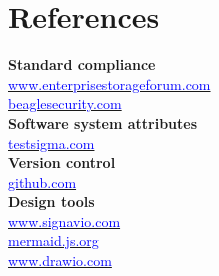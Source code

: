 \documentclass[11pt,twoside]{article}
\begin{document}
\section{References}
\textbf{Standard compliance}\\
\href{https://www.enterprisestorageforum.com/management/7-essential-compliance-regulations-for-data-storage-systems/}{\textcolor{blue}{www.enterprisestorageforum.com}}\\
\href{https://beaglesecurity.com/blog/article/software-compliance-standards.html}{\textcolor{blue}{beaglesecurity.com}}
\vspace{1\baselineskip} \\
\textbf{Software system attributes}\\
\href{https://testsigma.com/blog/software-quality-attributes/}{\textcolor{blue}{testsigma.com}}
\vspace{1\baselineskip} \\
\textbf{Version control}\\
\href{https://github.com/resources/articles/software-development/what-is-version-control}{\textcolor{blue}{github.com}}
\vspace{1\baselineskip} \\
\textbf{Design tools}\\
\href{https://www.signavio.com}{\textcolor{blue}{www.signavio.com}}\\
\href{https://mermaid.js.org}{\textcolor{blue}{mermaid.js.org}}\\
\href{https://www.drawio.com}{\textcolor{blue}{www.drawio.com}}
\end{document}
